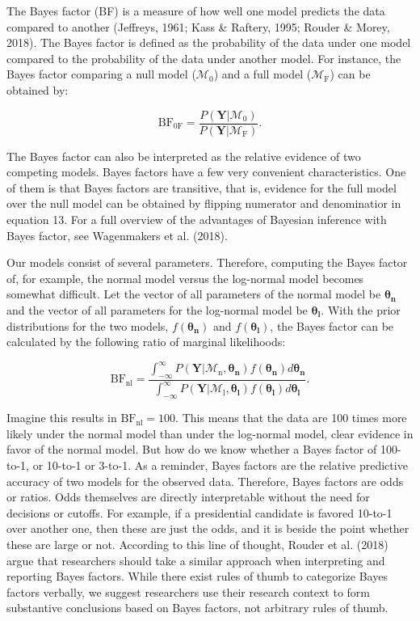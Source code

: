 \documentclass[
  english,
  doc,floatsintext]{apa6}
\begin{document}
The Bayes factor (BF) is a measure of how well one model predicts the data compared to another (Jeffreys, 1961; Kass \& Raftery, 1995; Rouder \& Morey, 2018). The Bayes factor is defined as the probability of the data under one model compared to the probability of the data under another model. For instance, the Bayes factor comparing a null model (\(\mathcal{M}_0\)) and a full model (\(\mathcal{M}_{\text{F}}\)) can be obtained by:

\begin{equation}
\text{BF}_{0\text{F}} = \frac{P(\bm{Y} | \mathcal{M}_0)}{P(\bm{Y} | \mathcal{M}_{\text{F}})}. 
\end{equation}

The Bayes factor can also be interpreted as the relative evidence of two competing models. Bayes factors have a few very convenient characteristics. One of them is that Bayes factors are transitive, that is, evidence for the full model over the null model can be obtained by flipping numerator and denominatior in equation 13. For a full overview of the advantages of Bayesian inference with Bayes factor, see Wagenmakers et al. (2018).

Our models consist of several parameters. Therefore, computing the Bayes factor of, for example, the normal model versus the log-normal model becomes somewhat difficult. Let the vector of all parameters of the normal model be \(\bm{\theta_\text{n}}\) and the vector of all parameters for the log-normal model be \(\bm{\theta_{\text{l}}}\). With the prior distributions for the two models, \(f(\bm{\theta_\text{n}})\) and \(f(\bm{\theta_\text{l}})\), the Bayes factor can be calculated by the following ratio of marginal likelihoods:

\begin{equation}
\text{BF}_{\text{nl}} = \frac{\int_{-\infty}^{\infty}P(\bm{Y} | \mathcal{M}_\text{n}, \bm{\theta_{\text{n}}})f(\bm{\theta_{\text{n}}})d\bm{\theta_{\text{n}}}}{\int_{-\infty}^{\infty}P(\bm{Y} | \mathcal{M}_\text{l}, \bm{\theta_{\text{l}}})f(\bm{\theta_{\text{l}}})d\bm{\theta_{\text{l}}}}. 
\end{equation}

Imagine this results in \(\text{BF}_{\text{nl}} = 100\). This means that the data are 100 times more likely under the normal model than under the log-normal model, clear evidence in favor of the normal model. But how do we know whether a Bayes factor of 100-to-1, or 10-to-1 or 3-to-1. As a reminder, Bayes factors are the relative predictive accuracy of two models for the observed data. Therefore, Bayes factors are odds or ratios. Odds themselves are directly interpretable without the need for decisions or cutoffs. For example, if a presidential candidate is favored 10-to-1 over another one, then these are just the odds, and it is beside the point whether these are large or not. According to this line of thought, Rouder et al. (2018) argue that researchers should take a similar approach when interpreting and reporting Bayes factors. While there exist rules of thumb to categorize Bayes factors verbally, we suggest researchers use their research context to form substantive conclusions based on Bayes factors, not arbitrary rules of thumb.
\end{document}
